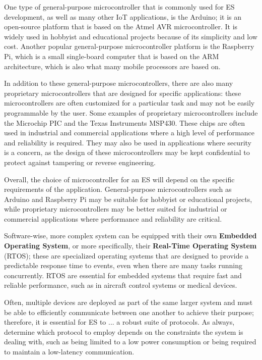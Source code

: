 One type of general-purpose microcontroller that is commonly used for ES development, as well as many other IoT applications, is the Arduino; it is an open-source platform that is based on the Atmel AVR microcontroller. It is widely used in hobbyist and educational projects because of its simplicity and low cost. Another popular general-purpose microcontroller platform is the Raspberry Pi, which is a small single-board computer that is based on the ARM architecture, which is also what many mobile processors are based on.

In addition to these general-purpose microcontrollers, there are also many proprietary microcontrollers that are designed for specific applications: these microcontrollers are often customized for a particular task and may not be easily programmable by the user. Some examples of proprietary microcontrollers include the Microchip PIC and the Texas Instruments MSP430. These chips are often used in industrial and commercial applications where a high level of performance and reliability is required. They may also be used in applications where security is a concern, as the design of these microcontrollers may be kept confidential to protect against tampering or reverse engineering.

Overall, the choice of microcontroller for an ES will depend on the specific requirements of the application. General-purpose microcontrollers such as Arduino and Raspberry Pi may be suitable for hobbyist or educational projects, while proprietary microcontrollers may be better suited for industrial or commercial applications where performance and reliability are critical.


Software-wise, more complex system can be equipped with their own \textbf{Embedded Operating System}, or more specifically, their \textbf{Real-Time Operating System} (RTOS); these are specialized operating systems that are designed to provide a predictable response time to events, even when there are many tasks running concurrently. RTOS are essential for embedded systems that require fast and reliable performance, such as in aircraft control systems or medical devices.

Often, multiple devices are deployed as part of the same larger system and must be able to efficiently communicate between one another to achieve their purpose; therefore, it is essential for ES to ... a robust suite of protocols.
As always, determine which protocol to employ depends on the constraints the system is dealing with, such as being limited to a low power consumption or being required to maintain a low-latency communication.

